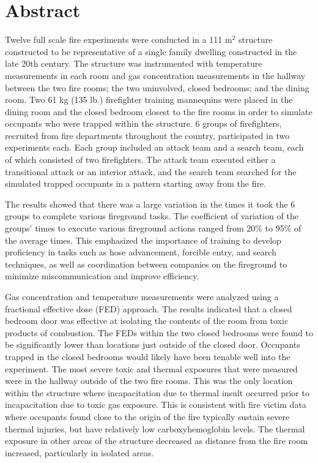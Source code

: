 \documentclass[12pt,oneside]{article}
\begin{document}
\section{Abstract}
 Twelve full scale fire experiments were conducted in a 111 m$^2$ structure constructed to be representative of a single family dwelling constructed in the late 20th century. The structure was instrumented with temperature measurements in each room and gas concentration measurements in the hallway between the two fire rooms; the two uninvolved, closed bedrooms; and the dining room. Two 61 kg (135 lb.) firefighter training mannequins were placed in the dining room and the closed bedroom closest to the fire rooms in order to simulate occupants who were trapped within the structure. 6 groups of firefighters, recruited from fire departments throughout the country, participated in two experiments each. Each group included an attack team and a search team, each of which consisted of two firefighters. The attack team executed either a transitional attack or an interior attack, and the search team searched for the simulated trapped occupants in a pattern starting away from the fire. 

The results showed that there was a large variation in the times it took the 6 groups to complete various fireground tasks. The coefficient of variation of the groups' times to execute various fireground actions ranged from 20\% to 95\% of the average times. This emphasized the importance of training to develop proficiency in tasks such as hose advancement, forcible entry, and search techniques, as well as coordination between companies on the fireground to minimize miscommunication and improve efficiency. 

Gas concentration and temperature measurements were analyzed using a fractional effective dose (FED) approach. The results indicated that a closed bedroom door was effective at isolating the contents of the room from toxic products of combustion. The FEDs within the two closed bedrooms were found to be significantly lower than locations just outside of the closed door. Occupants trapped in the closed bedrooms would likely have been tenable well into the experiment. The most severe toxic and thermal exposures that were measured were in the hallway outside of the two fire rooms. This was the only location within the structure where incapacitation due to thermal insult occurred prior to incapacitation due to toxic gas exposure. This is consistent with fire victim data where occupants found close to the  origin of the fire typically sustain severe thermal injuries, but have relatively low carboxyhemoglobin levels. The thermal exposure in other areas of the structure decreased as distance from the fire room increased, particularly in isolated areas. 
\end{document}

